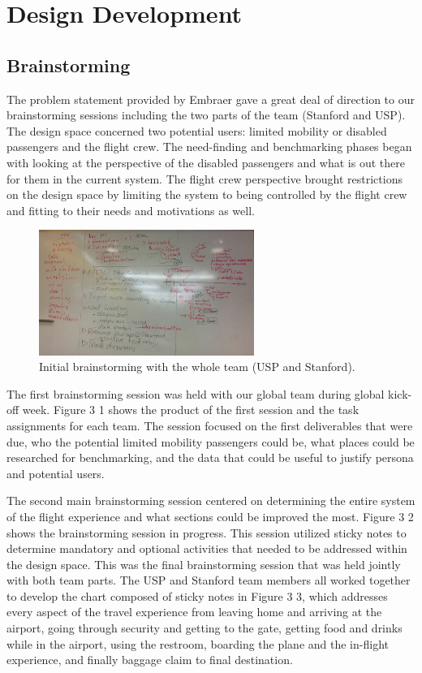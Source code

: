 \documentclass[a4paper, 12pt,conference]{new_cit_thesis}
\begin{document}
\chapter{Design Development}
\section{Brainstorming}
The problem statement provided by Embraer gave a great deal of direction to our brainstorming sessions including the two parts of the team (Stanford and USP).  The design space concerned two potential users: limited mobility or disabled passengers and the flight crew.  The need-finding and benchmarking phases began with looking at the perspective of the disabled passengers and what is out there for them in the current system.  The flight crew perspective brought restrictions on the design space by limiting the system to being controlled by the flight crew and fitting to their needs and motivations as well.

\begin{figure}[h]
  \centering
     \includegraphics[width=7cm]{images/image017}
   \caption{Initial brainstorming with the whole team (USP and Stanford).}
  \label{fig:17}
\end{figure}

The first brainstorming session was held with our global team during global kick-off week.  Figure 3 1 shows the product of the first session and the task assignments for each team.  The session focused on the first deliverables that were due, who the potential limited mobility passengers could be, what places could be researched for benchmarking, and the data that could be useful to justify persona and potential users.

The second main brainstorming session centered on determining the entire system of the flight experience and what sections could be improved the most. Figure 3 2 shows the brainstorming session in progress.  This session utilized sticky notes to determine mandatory and optional activities that needed to be addressed within the design space. This was the final brainstorming session that was held jointly with both team parts.  The USP and Stanford team members all worked together to develop the chart composed of sticky notes in Figure 3 3, which addresses every aspect of the travel experience from leaving home and arriving at the airport, going through security and getting to the gate, getting food and drinks while in the airport, using the restroom, boarding the plane and the in-flight experience, and finally baggage claim to final destination.
\end{document}
